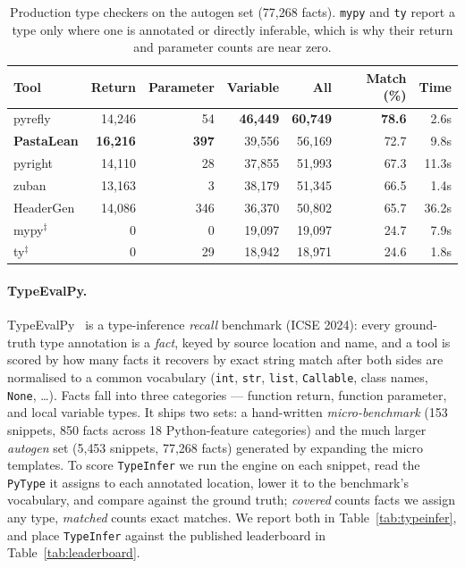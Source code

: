\documentclass{article}
\newcommand{\code}{\lstinline}
\begin{document}
\begin{table}[t]
\centering
\begin{tabular}{@{}lrrrrrr@{}}
\toprule
Tool & Return & Parameter & Variable & All & Match (\%) & Time \\
\midrule
pyrefly            & 14{,}246 & 54  & \textbf{46{,}449} & \textbf{60{,}749} & \textbf{78.6} & 2.6s \\
\textbf{PastaLean} & \textbf{16{,}216} & \textbf{397} & 39{,}556 & 56{,}169 & 72.7 & 9.8s \\
pyright            & 14{,}110 & 28  & 37{,}855 & 51{,}993 & 67.3 & 11.3s \\
zuban              & 13{,}163 & 3   & 38{,}179 & 51{,}345 & 66.5 & 1.4s \\
HeaderGen          & 14{,}086 & 346 & 36{,}370 & 50{,}802 & 65.7 & 36.2s \\
mypy$^\ddagger$    & 0        & 0   & 19{,}097 & 19{,}097 & 24.7 & 7.9s \\
ty$^\ddagger$      & 0        & 29  & 18{,}942 & 18{,}971 & 24.6 & 1.8s \\
\bottomrule
\end{tabular}
\caption{Production type checkers on the autogen set (77{,}268 facts). \texttt{mypy} and \texttt{ty} report a type only where one is annotated or directly inferable, which is why their return and parameter counts are near zero.}
\label{tab:checkers-auto}
\end{table}


\paragraph{TypeEvalPy.} TypeEvalPy~\cite{typeevalpy} is a type-inference \emph{recall} benchmark (ICSE 2024): every ground-truth type annotation is a \emph{fact}, keyed by source location and name, and a tool is scored by how many facts it recovers by exact string match after both sides are normalised to a common vocabulary (\code{int}, \code{str}, \code{list}, \code{Callable}, class names, \code{None}, \ldots). Facts fall into three categories --- function return, function parameter, and local variable types. It ships two sets: a hand-written \emph{micro-benchmark} (153 snippets, 850 facts across 18 Python-feature categories) and the much larger \emph{autogen} set (5{,}453 snippets, 77{,}268 facts) generated by expanding the micro templates. To score \code{TypeInfer} we run the engine on each snippet, read the \code{PyType} it assigns to each annotated location, lower it to the benchmark's vocabulary, and compare against the ground truth; \emph{covered} counts facts we assign any type, \emph{matched} counts exact matches. We report both in Table~\ref{tab:typeinfer}, and place \code{TypeInfer} against the published leaderboard in Table~\ref{tab:leaderboard}.
\end{document}

